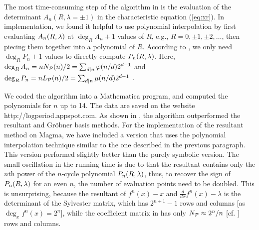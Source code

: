 \documentclass{ws-ijbc}
\begin{document}
The most time-consuming step of the algorithm in 
  is the evaluation of the determinant $A_n(R, \lambda = \pm1)$
  in the characteristic equation (\ref{eq:xr}).
%
In implementation,
we found it helpful to use polynomial interpolation
by first evaluating $A_n(R, \lambda)$ at $\deg_R A_n + 1$ values of $R$,
e.g., $R = 0, \pm1, \pm2,\ldots$, then piecing them together
into a polynomial of $R$.
%
According to , we only need $\deg_R P_n + 1$ values
  to directly compute $P_n(R, \lambda)$.
%
%
Here,
$\deg_R A_n = n N_\mathcal P(n)/2 = \sum_{d|n} \varphi(n/d) 2^{d-1}$
and $\deg_R P_n = n L_\mathcal P(n)/2 = \sum_{d|n} \mu(n/d) 2^{d-1}$
  \cite{mira, stephenson1}.
%
%


We coded the algorithm into a Mathematica program,
  and computed the polynomials for $n$ up to 14.
The data are saved on the website http://logperiod.appspot.com.
%
%
%
%
%
As shown in , the algorithm
  outperformed the resultant \cite{burm} and
  Gr\"obner basis \cite{kk1} methods.
For the implementation of the resultant method on Magma, we have included a version
  that uses the polynomial interpolation technique
  similar to the one described in the previous paragraph.
This version performed slightly better than the purely symbolic version.
The small oscillation in the running time is due to that the resultant contains
  only the $n$th power of the $n$-cycle polynomial $P_n(R, \lambda)$,
thus, to recover the sign of $P_n(R, \lambda)$ for an even $n$,
  the number of evaluation points need to be doubled.
%
This is unsurprising,
  because the resultant of $f^n(x)-x$ and $\frac{d}{dx}f^n(x)-\lambda$
  is the determinant of the Sylvester matrix, which has
  $2^{n+1}-1$ rows and columns
  [as $\deg_x f^n(x) = 2^n$],
  while the coefficient matrix in 
  has only $N_\mathcal P \approx 2^n/n$ [cf. ] rows and columns.
\end{document}
